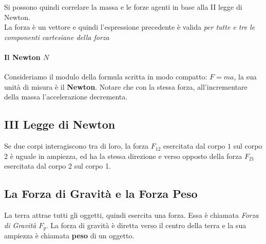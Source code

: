 \documentclass[12pt, a4paper, openany]{book}
\begin{document}
Si possono quindi correlare la massa e le forze agenti in base alla II legge di Newton.\\
La forza è un vettore e quindi l'espressione precedente è valida \emph{per tutte e tre le componenti cartesiane della forza}

\paragraph*{Il Newton $N$}
Consideriamo il modulo della formula scritta in modo compatto: $F=ma$, la sua unità di misura è il \textbf{Newton}.
Notare che con la stessa forza, all'incrementare della massa l'accelerazione decrementa.

\subsection{III Legge di Newton}
Se due corpi interagiscono tra di loro, la forza $F_{12}$ esercitata dal corpo $1$ sul corpo $2$ è uguale in ampiezza,
ed ha la stessa direzione e verso opposto della forza $F_{21}$ esercitata dal corpo 2 sul corpo 1.

\subsection{La Forza di Gravità e la Forza Peso}
La terra attrae tutti gli oggetti, quindi esercita una forza. Essa è chiamata \emph{Forza di Gravità $F_g$}.
La forza di gravità è diretta verso il centro della terra e la sua ampiezza è chiamata \textbf{peso} di un oggetto.
\end{document}
